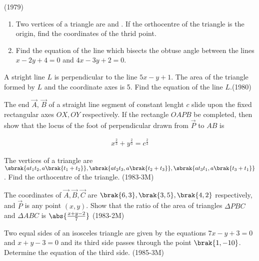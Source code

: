 \iffalse
\title{	Assignment}
\author{Golla Shriram - AI24BTech11010}
\section{subjective}
 \fi                                                                           


\item                    	\hfill{(1979)}
	\begin{enumerate}
             \item  Two vertices of a triangle are  and . If the orthocentre of the triangle is the origin, find the coordinates of the thrid point.
	     \item  Find the equation of the line which bisects the obtuse angle between  the lines $x-2y+4=0$ and $4x-3y+2=0$.
         \end{enumerate}

\item A stright line $L$ is perpendicular to the line $5x-y+1$. The area of the triangle formed by $L$ and the coordinate axes is 5. Find the equation of the line $L$.\hfill{(1980)}

\item The end $\vec{A}$, $\vec{B}$ of a straight line segment of constant lenght $c$ slide upon the fixed rectangular axes $ OX, OY$ respectively. If the rectangle $OAPB$ be completed, then show that the locus of the foot of perpendicular drawn from $\vec{P}$ to $AB$ is 

 \begin{align*}  x^\frac{2}{3} + y^\frac{2}{3} = c^\frac{2}{3} \end{align*}

  \item The vertices of a triangle are $\sbrak{ at_1t_2,a\brak{t_1+t_2}}, \sbrak{ at_2t_3,a\brak{t_2+t_3}},\sbrak{at_3t_1,a\brak{t_3+t_1}}$. Find the orthocentre of the triangle. \hfill{(1983-3M)}
	  
  \item The coordinates of $\vec{A},\vec{B},\vec{C}$ are $ \brak{6,3}, \brak{3,5}, \brak{4,2} $ respectively, and $\vec{P}$ is any point $(x,y)$.
Show that the ratio of the area of triangles $\Delta PBC$  and $\Delta ABC$ is $\abs{\frac{x+y-2}{7}}$ \hfill{(1983-2M)} 

\item Two equal sides of an isosceles triangle are given by the equations $7x-y+3=0$ and $x+y-3=0$ and its third side passes through the point $\brak{1,-10}$. Determine the equation of the third side.  \hfill{(1985-3M)}

